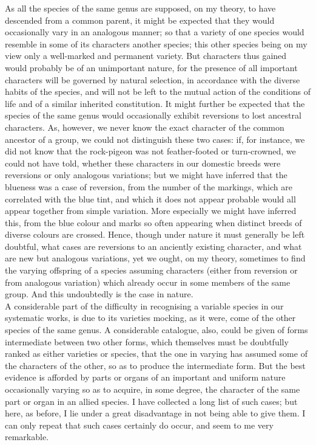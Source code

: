 \indent As all the species of the same genus are supposed, on my theory, to have descended from a common parent, it might be expected that they would occasionally vary in an analogous manner; so that a variety of one species would resemble in some of its characters another species; this other species being on my view only a well-marked and permanent variety. But characters thus gained would probably be of an unimportant nature, for the presence of all important characters will be governed by natural selection, in accordance with the diverse habits of the species, and will not be left to the mutual action of the conditions of life and of a similar inherited constitution. It might further be expected that the species of the same genus would occasionally exhibit reversions to lost ancestral characters. As, however, we never know the exact character of the common ancestor of a group, we could not distinguish these two cases: if, for instance, we did not know that the rock-pigeon was not feather-footed or turn-crowned, we could not have told, whether these characters in our domestic breeds were reversions or only analogous variations; but we might have inferred that the blueness was a case of reversion, from the number of the markings, which are correlated with the blue tint, and which it does not appear probable would all appear together from simple variation. More especially we might have inferred this, from the blue colour and marks so often appearing when distinct breeds of diverse colours are crossed. Hence, though under nature it must generally be left doubtful, what cases are reversions to an anciently existing character, and what are new but analogous variations, yet we ought, on my theory, sometimes to find the varying offspring of a species assuming characters (either from reversion or from analogous variation) which already occur in some members of the same group. And this undoubtedly is the case in nature.\\
\indent A considerable part of the difficulty in recognising a variable species in our systematic works, is due to its varieties mocking, as it were, come of the other species of the same genus. A considerable catalogue, also, could be given of forms intermediate between two other forms, which themselves must be doubtfully ranked as either varieties or species, that the one in varying has assumed some of the characters of the other, so as to produce the intermediate form. But the best evidence is afforded by parts or organs of an important and uniform nature occasionally varying so as to acquire, in some degree, the character of the same part or organ in an allied species. I have collected a long list of such cases; but here, as before, I lie under a great disadvantage in not being able to give them. I can only repeat that such cases certainly do occur, and seem to me very remarkable.\\
